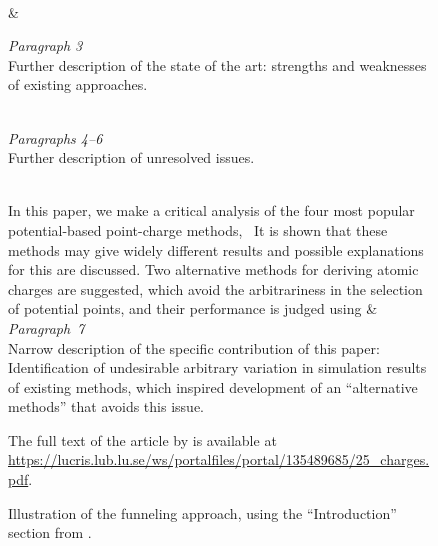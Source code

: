 \begin{figure}[p]
\begin{tblr}{}
{			\\
			\null\hspace{\baselineskip}\textellipsis
		}
		&
		{%
			\textit{Paragraph 3} \\
			Further description of the state of the art: strengths and weaknesses of existing approaches. \\
			\strut \\[2ex]
			\textit{Paragraphs 4--6} \\
			Further description of unresolved issues.
		}
		\\
		\hspace{\baselineskip}In this paper, we make a critical analysis of the four most popular potential-based point-charge methods, \textellipsis\ It is shown that these methods may give widely different results and possible explanations for this are discussed. Two alternative methods for deriving atomic charges are suggested, which avoid the arbitrariness in the selection of potential points, and their performance is judged using \textellipsis
		&
		{%
			\textit{Paragraph~7} \\
			Narrow description of the specific contribution of this paper: Identification of undesirable arbitrary variation in simulation results of existing methods, which inspired development of an ``alternative methods'' that avoids this issue.
		}
	\end{tblr}%
	\caption{%
		Illustration of the funneling approach, using the ``Introduction'' section from \citet{sigfridsson}.
	}
	\label{fig:sigfridsson:intro}
	\begin{figurenotes}
		The full text of the article by \citet{sigfridsson} is available at \url{https://lucris.lub.lu.se/ws/portalfiles/portal/135489685/25_charges.pdf}.
	\end{figurenotes}
\end{figure}

